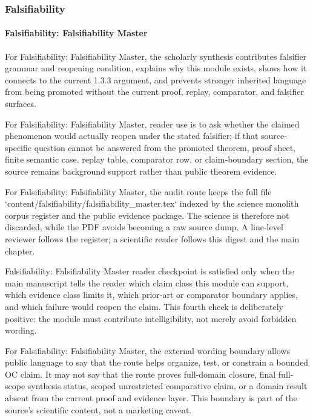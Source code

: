 \subsubsection{Falsifiability}

\paragraph{Falsifiability: Falsifiability Master}

For Falsifiability: Falsifiability Master, the scholarly synthesis contributes falsifier grammar and reopening condition, explains why this module exists, shows how it connects to the current 1.3.3 argument, and prevents stronger inherited language from being promoted without the current proof, replay, comparator, and falsifier surfaces.


For Falsifiability: Falsifiability Master, reader use is to ask whether the claimed phenomenon would actually reopen under the stated falsifier; if that source-specific question cannot be answered from the promoted theorem, proof sheet, finite semantic case, replay table, comparator row, or claim-boundary section, the source remains background support rather than public theorem evidence.


For Falsifiability: Falsifiability Master, the audit route keeps the full file `content/falsifiability/falsifiability\_master.tex` indexed by the science monolith corpus register and the public evidence package. The science is therefore not discarded, while the PDF avoids becoming a raw source dump. A line-level reviewer follows the register; a scientific reader follows this digest and the main chapter.


Falsifiability: Falsifiability Master reader checkpoint is satisfied only when the main manuscript tells the reader which claim class this module can support, which evidence class limits it, which prior-art or comparator boundary applies, and which failure would reopen the claim. This fourth check is deliberately positive: the module must contribute intelligibility, not merely avoid forbidden wording.


For Falsifiability: Falsifiability Master, the external wording boundary allows public language to say that the route helps organize, test, or constrain a bounded OC claim. It may not say that the route proves full-domain closure, final full-scope synthesis status, scoped unrestricted comparative claim, or a domain result absent from the current proof and evidence layer. This boundary is part of the source's scientific content, not a marketing caveat.


